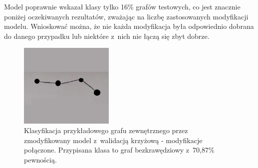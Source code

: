 Model poprawnie wskazał klasy tylko 16\% grafów testowych, co jest znacznie poniżej oczekiwanych rezultatów,
zważając na liczbę zastosowanych modyfikacji modelu.
Wnioskować można, że nie każda modyfikacja była odpowiednio dobrana do danego przypadku
lub niektóre z~nich nie łączą się zbyt dobrze.

\begin{figure}[ht]
	\centering
	\includegraphics[height=4cm]{../graph_classification/test_graphs/drawn/path-3.png}
	\caption{Klasyfikacja przykładowego grafu zewnętrznego przez zmodyfikowany model z~walidacją krzyżową - modyfikacje połączone.
		Przypisana klasa to graf bezkrawędziowy z~70,87\% pewnością.}
	\label{Fig:tests-cv-5d}
\end{figure}
\FloatBarrier